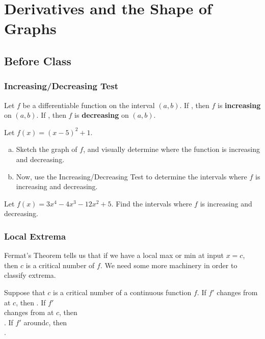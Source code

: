 \documentclass[notes]{subfiles}
\begin{document}
	\setcounter{section}{4}
	\fancyhead[LO,RE]{\bfseries \small \currentname}
	\fancyfoot[C]{{}}
	\fancyfoot[LO,RE]{\large \thepage}	%
	
\section*{Derivatives and the Shape of Graphs}\label{cs45}
	\subsection*{Before Class}
	\subsubsection*{Increasing/Decreasing Test}
		\begin{thm}
			Let \(f\) be a differentiable function on the interval \((a,b)\).  If ,\vspace{20pt} then \(f\) is  \textbf{increasing} on \((a,b)\).  If , then \(f\) is \textbf{decreasing} on \((a,b)\).
		\end{thm}
		
		\begin{ex}
			Let \(f(x) = (x-5)^2 + 1\).
			\begin{enumerate}[(a)]
				\item Sketch the graph of \(f\), and visually determine where the function is increasing and decreasing.
					
				\item Now, use the Increasing/Decreasing Test to determine the intervals where \(f\) is increasing and decreasing.
			\end{enumerate}
		\end{ex}
			\newpage
			
		\begin{ex}
			Let \(f(x) = 3x^4-4x^3-12x^2+5\).  Find the intervals where \(f\) is increasing and decreasing.
		\end{ex}
			
	\subsubsection*{Local Extrema}
		Fermat's Theorem tells us that if we have a local max or min at input \(x = c\), then \(c\) is a critical number of \(f\).  We need some more machinery in order to classify extrema.   
		\begin{thm}
			Suppose that \(c\) is a critical number of a continuous function \(f\).  If \(f'\) changes from\\[20pt]  at \(c\), then . If \(f'\)\\[20pt]  changes from  at \(c\), then \\[20pt] . If \(f'\)  around\(c\), then\\[20pt] .
		\end{thm}
\end{document}
